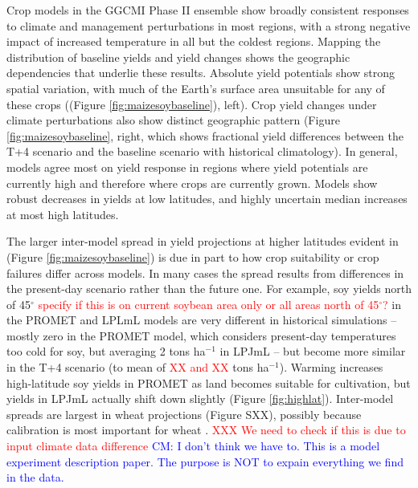 \documentclass[gmd, manuscript]{copernicus} %
\begin{document}
Crop models in the GGCMI Phase II ensemble show broadly consistent responses to climate and management perturbations in most regions, with a strong negative impact of increased temperature in all but the coldest regions. 
Mapping the distribution of baseline yields and yield changes shows the geographic dependencies that underlie these results. 
Absolute yield potentials show strong spatial variation, with much of the Earth's surface area unsuitable for any of these crops ((Figure \ref{fig:maizesoybaseline}), left).
Crop yield changes under climate perturbations also show distinct geographic pattern (Figure \ref{fig:maizesoybaseline}, right, which shows fractional yield differences between the T+4 scenario and the baseline scenario with historical climatology).
In general, models agree most on yield response in regions where yield potentials are currently high and therefore where crops are currently grown. 
Models show robust decreases in yields at low latitudes, and highly uncertain median increases at most high latitudes. 

The larger inter-model spread in yield projections at higher latitudes evident in (Figure \ref{fig:maizesoybaseline}) is due in part to how crop suitability or crop failures differ across models. In many cases the spread results from differences in the present-day scenario rather than the future one.  For example, soy yields north of 45$^\circ$ \textcolor{red}{specify if this is on current soybean area only or all areas north of 45$^\circ$?} in the PROMET and LPLmL models are very different in historical simulations -- mostly zero in the PROMET model, which considers present-day temperatures too cold for soy, but averaging 2 tons ha$^{-1}$ in LPJmL -- but become more similar in the T+4 scenario (to mean of \textcolor{red}{XX and XX} tons ha$^{-1}$). Warming increases high-latitude soy yields in PROMET as land becomes suitable for cultivation, but yields in LPJmL actually shift down slightly (Figure \ref{fig:highlat}). Inter-model spreads are largest in wheat projections (Figure SXX), possibly because calibration is most important for wheat \citep[e.g.][]{Asseng2013}.
\textcolor{red}{XXX We need to check if this is due to input climate data difference}
\textcolor{blue}{CM: I don't think we have to. This is a model experiment description paper. The purpose is NOT to expain everything we find in the data.}
\end{document}
